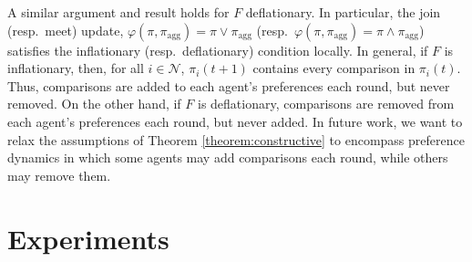 \documentclass[conference]{ieeeconf}
\newcommand{\N}{\mathcal{N}}
\newcommand{\A}{\mathcal{A}}
\renewcommand{\SS}{\mathcal{S}}
\newcommand{\Pref}{\mathsf{Pre}}
\newcommand{\profile}{\boldsymbol{\pi}}
\newcommand{\join}{\vee}
\newcommand{\meet}{\wedge}
\newcommand{\bigmeet}{\bigwedge}
\renewcommand{\geq}{\geqslant}
\newtheorem{corollary}{Corollary}
\begin{document}


A similar argument and result holds for $F$ deflationary. In particular, the join (resp.~meet) update, $\varphi(\pi,\pi_{\text{agg}}) = \pi \join \pi_{\text{agg}}$ (resp.~$\varphi(\pi,\pi_{\text{agg}}) = \pi \meet \pi_{\text{agg}}$) satisfies the inflationary (resp.~deflationary) condition locally. In general, if $F$ is inflationary, then, for all $i \in \N$, $\pi_i(t+1)$ contains every comparison in $\pi_i(t)$. Thus, comparisons are added to each agent's preferences each round, but never removed. On the other hand, if $F$ is deflationary, comparisons are removed from each agent's preferences each round, but never added. In future work, we want to relax the assumptions of Theorem \ref{theorem:constructive} to encompass preference dynamics in which some agents may add comparisons each round, while others may remove them.

\vspace{-0.5cm}
\section{Experiments}
\label{sec:experiments}
\end{document}
